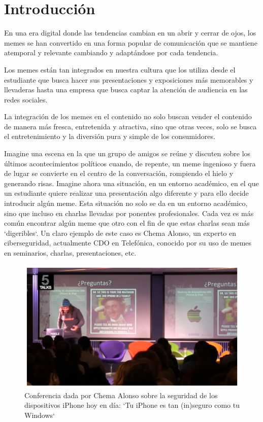 \chapter{Introducción}

En una era digital donde las tendencias cambian en un abrir y cerrar de ojos, los memes se han convertido en una forma popular de comunicación que se mantiene atemporal y relevante cambiando y adaptándose por cada tendencia.

Los memes están tan integrados en nuestra cultura que los utiliza desde el estudiante que busca hacer sus presentaciones y exposiciones más memorables y llevaderas hasta una empresa que busca captar la atención de audiencia en las redes sociales.

La integración de los memes en el contenido no solo buscan vender el contenido de manera más fresca, entretenida y atractiva, sino que otras veces, solo se busca el entretenimiento y la diversión pura y simple de los consumidores.

Imagine una escena en la que un grupo de amigos se reúne y discuten sobre los últimos acontecimientos políticos cuando, de repente, un meme ingenioso y fuera de lugar se convierte en el centro de la conversación, rompiendo el hielo y generando risas. Imagine ahora una situación, en un entorno académico, en el que un estudiante quiere realizar una presentación algo diferente y para ello decide introducir algún meme. Esta situación no solo se da en un entorno académico, sino que incluso en charlas llevadas por ponentes profesionales. Cada vez es más común encontrar algún meme que otro con el fin de que estas charlas sean más `digeribles`. Un claro ejemplo de este caso es Chema Alonso, un experto en ciberseguridad, actualmente CDO en Telefónica, conocido por su uso de memes en seminarios, charlas, presentaciones, etc.

\begin{figure} [H]
    \begin{center}
    \caption{Conferencia dada por Chema Alonso sobre la seguridad de los dispositivos iPhone hoy en día: `Tu iPhone es tan (in)seguro como tu Windows`}
    \includegraphics[scale=0.3]{figuras/chemalonso.png}
    \end{center}
\end{figure}

